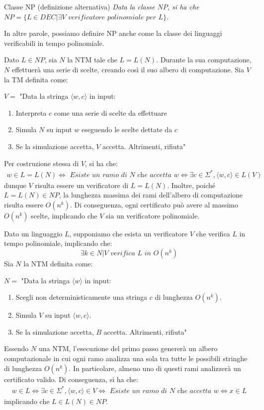 \begin{Thm}{Classe NP (definizione alternativa)}{}
\textit{Data la classe $NP$, si ha che $NP = \{L \in DEC | \exists V\textit{ verificatore polinomiale per }L\}$.}

In altre parole, possiamo definire NP anche come la classe dei linguaggi verificabili
in tempo polinomiale.

\begin{demonstration}
Dato $L\in NP$, sia $N$ la NTM tale che $L = L(N)$. Durante la sua computazione, $N$ effettuerà una serie di scelte, creando così il suo albero di computazione. Sia $V$ la TM definita come:

$V =$ "Data la stringa $\langle w, c\rangle$ in input:
\begin{enumerate}
    \item Interpreta $c$ come una serie di scelte da effettuare
    \item Simula $N$ su input $w$ eseguendo le scelte dettate da $c$
    \item Se la simulazione accetta, $V$ accetta. Altrimenti, rifiuta"
\end{enumerate}
Per costruzione stessa di $V$, si ha che:
\begin{align*}
w \in L = L(N) \iff\textit{ Esiste un ramo di }N \textit{ che accetta }w \iff \exists c \in \Sigma^*,\langle w, c\rangle \in L(V)
\end{align*}
dunque $V$ risulta essere un verificatore di $L = L(N)$. Inoltre, poiché $L = L(N) \in NP$, la lunghezza massima dei rami dell’albero di computazione risulta essere $O(n^k)$. Di conseguenza, ogni certificato può avere al massimo $O(n^k)$ scelte, implicando che $V$ sia un verificatore polinomiale.

Dato un linguaggio $L$, supponiamo che esista un verificatore $V$ che verifica $L$ in tempo polinomiale, implicando che:
\begin{equation*}
    \exists k \in N | V\textit{ verifica }L\textit{ in }O(n^k)
\end{equation*}
Sia $N$ la NTM definita come: 

$N =$ "Data la stringa $\langle w\rangle$ in input:
\begin{enumerate}
    \item Scegli non deterministicamente una stringa $c$ di lunghezza $O(n^k)$.
    \item Simula $V$ su input $\langle w, c\rangle$.
    \item Se la simulazione accetta, $B$ accetta. Altrimenti, rifiuta"
\end{enumerate}
Essendo $N$ una NTM, l’esecuzione del primo passo genererà un albero computazionale in cui ogni ramo analizza una sola tra tutte le possibili stringhe di lunghezza $O(n^k)$. In particolare, almeno uno di questi rami analizzerà un certificato valido. Di conseguenza, si ha che:
\begin{align*}
w \in L \iff \exists c \in \Sigma^*,\langle w, c\rangle \in V \iff\textit{ Esiste un ramo di }N\textit{ che accetta }w \iff x \in L
\end{align*}
implicando che $L \in L(N) \in NP$.
\end{demonstration}
\end{Thm}

